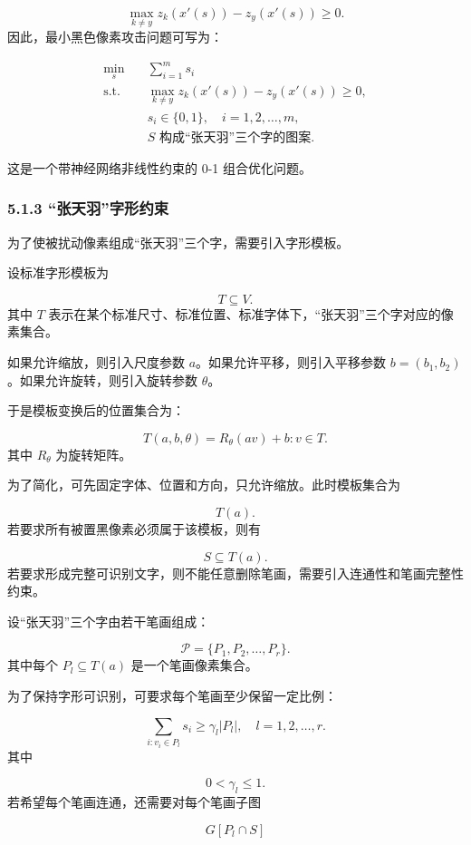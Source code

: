 ﻿\documentclass[UTF8,zihao=-4,fontset=none]{ctexart}
\begin{document}
\[
\max_{k\ne y}z_k(x'(s))-z_y(x'(s))\ge 0.
\]
\noindent 因此，最小黑色像素攻击问题可写为：

\[
\begin{aligned}
\min_s
\quad
&
\sum_{i=1}^{m}s_i\\
\mathrm{s.t.}
\quad
&
\max_{k\ne y}z_k(x'(s))-z_y(x'(s))\ge 0,\\
&
s_i\in\{0,1\},
\quad i=1,2,\ldots,m,\\
&
S\text{ 构成“张天羽”三个字的图案}.
\end{aligned}
\]

这是一个带神经网络非线性约束的 0-1 组合优化问题。

\subsubsection*{5.1.3 “张天羽”字形约束}
{}

为了使被扰动像素组成“张天羽”三个字，需要引入字形模板。

设标准字形模板为

\[
T\subseteq V.
\]
\noindent 其中 \(T\) 表示在某个标准尺寸、标准位置、标准字体下，“张天羽”三个字对应的像素集合。

如果允许缩放，则引入尺度参数 \(a\)。如果允许平移，则引入平移参数 \(b=(b_1,b_2)\)。如果允许旋转，则引入旋转参数 \(\theta\)。

于是模板变换后的位置集合为：

\[
T(a,b,\theta)
=
{R_\theta(av)+b:v\in T}.
\]
\noindent 其中 \(R_\theta\) 为旋转矩阵。

为了简化，可先固定字体、位置和方向，只允许缩放。此时模板集合为

\[
T(a).
\]
\noindent 若要求所有被置黑像素必须属于该模板，则有

\[
S\subseteq T(a).
\]
\noindent 若要求形成完整可识别文字，则不能任意删除笔画，需要引入连通性和笔画完整性约束。

设“张天羽”三个字由若干笔画组成：

\[
\mathcal{P}=\{P_1,P_2,\ldots,P_r\}.
\]
\noindent 其中每个 \(P_l\subseteq T(a)\) 是一个笔画像素集合。

为了保持字形可识别，可要求每个笔画至少保留一定比例：

\[
\sum_{i:v_i\in P_l}s_i
\ge
\gamma_l |P_l|,
\quad l=1,2,\ldots,r.
\]
\noindent 其中

\[
0<\gamma_l\le 1.
\]
\noindent 若希望每个笔画连通，还需要对每个笔画子图

\[
G[P_l\cap S]
\]
\end{document}
